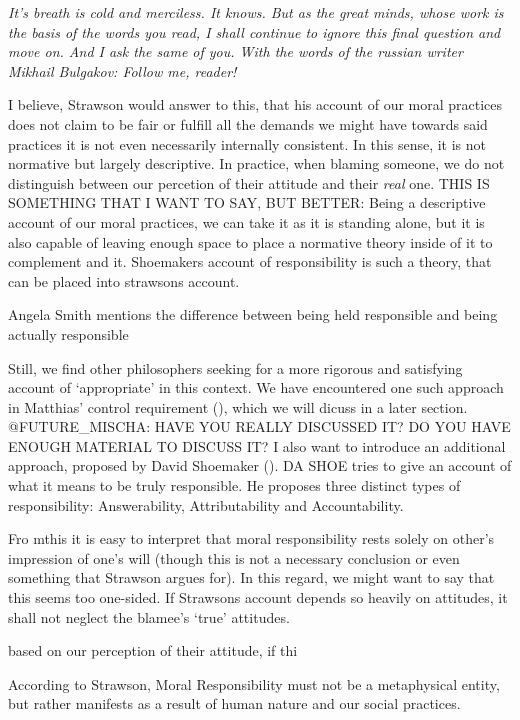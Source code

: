 \documentclass{article}
\begin{document}
 \textit{It's breath is cold and merciless. It knows. But as the great minds, whose work
 is the basis of the words you read, I shall continue to ignore this final
 question and move on. And I ask the same of you. With the words of the russian
 writer Mikhail Bulgakov: Follow me, reader!}

 I believe, Strawson would answer to this, that his account of our moral practices
 does not claim to be fair or fulfill all the demands we might have towards said
 practices it is not even necessarily internally consistent. In this sense, it is
 not normative but largely descriptive. In practice, when blaming someone, we do
 not distinguish between our percetion of their attitude and their \textit{real}
 one.
 THIS IS SOMETHING THAT I WANT TO SAY, BUT BETTER:
 Being a descriptive account of our moral practices, we can take it as it is
 standing alone, but it is also capable of leaving enough space to place a
 normative theory inside of it to complement and it. Shoemakers account of
 responsibility is such a theory, that can be placed into strawsons account.

 Angela Smith mentions the difference between being held responsible and being
 actually responsible

 Still, we find other philosophers seeking for a more rigorous and satisfying
 account of `appropriate' in this context.  We have encountered one such approach
 in Matthias' control requirement (\cite[p.175]{Matthias_2004}), which we will
 dicuss in a later section. @FUTURE\_MISCHA: HAVE YOU REALLY DISCUSSED IT?  DO
 YOU HAVE ENOUGH MATERIAL TO DISCUSS IT?
 I also want to introduce an additional approach, proposed by David Shoemaker
 (\cite{Shoemaker_2011}). DA SHOE tries to give an account of what it means to
 be truly responsible. He proposes three distinct types of responsibility:
 Answerability, Attributability and Accountability.

 Fro mthis it is easy to interpret that moral responsibility
 rests solely on other's impression of one's will (though this is not a
 necessary conclusion or even something that Strawson argues for). In this regard, we might
 want to say that this seems too one-sided. If Strawsons account depends so
 heavily on attitudes, it shall not neglect the blamee's `true' attitudes.

 based on our perception of
 their attitude, if thi


According to Strawson, Moral Responsibility must not be a metaphysical entity,
but rather manifests as a result of human nature and our social practices.
\end{document}
